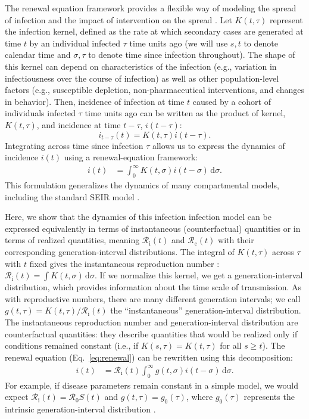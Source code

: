\documentclass[12pt]{article}
\newcommand{\eref}[1]{Eq.~\ref{eq:#1}}
\newcommand{\Rx}[1]{\ensuremath{{\mathcal R}_{#1}}\xspace}
\newcommand{\Ro}{\Rx{0}}
\newcommand{\Rc}{\Rx{\mathrm{c}}}
\newcommand{\Ri}{\Rx{\mathrm{i}}}
\newcommand{\dd}[1]{\ensuremath{\, \mathrm{d}#1}}
\newcommand{\dsigma}{\dd{\sigma}}
\begin{document}
The renewal equation framework provides a flexible way of modeling the spread of infection and the impact of intervention on the spread \citep{fraser2007estimating}.
Let $K(t, \tau)$ represent the infection kernel, defined as the rate at which secondary cases are generated at time $t$ by an individual infected $\tau$ time units ago (we will use $s, t$ to denote calendar time and $\sigma, \tau$ to denote time since infection throughout).
The shape of this kernel can depend on characteristics of the infection (e.g., variation in infectiousness over the course of infection) as well as other population-level factors (e.g., susceptible depletion, non-pharmaceutical interventions, and changes in behavior).
Then, incidence of infection at time $t$ caused by a cohort of individuals infected $\tau$ time units ago can be written as the product of kernel, $K(t, \tau)$, and incidence at time $t-\tau$, $i(t-\tau)$:
\begin{equation}
i_{t-\tau}(t) = K(t, \tau) i(t-\tau).
\end{equation}
Integrating across time since infection $\tau$ allows us to express the dynamics of incidence $i(t)$ using a renewal-equation framework: 
\begin{align}
i(t) &= \int_0^\infty K(t, \sigma) i(t-\sigma) \dsigma.
\label{eq:renewal}
\end{align}
This formulation generalizes the dynamics of many compartmental models, including the standard SEIR model \citep{heesterbeek1996concept, diekmann2000mathematical, roberts2004modelling, aldis2005integral, roberts2007model, champredon2018equivalence}.

Here, we show that the dynamics of this infection infection model can be expressed equivalently in terms of instantaneous (counterfactual) quantities or in terms of realized quantities, meaning $\Ri(t)$ and $\Rc(t)$ with their corresponding generation-interval distributions.
The integral of $K(t, \tau)$ across $\tau$ with $t$ fixed gives the instantaneous reproduction number \citep{fraser2007estimating}: $\Ri(t) = \int K(t, \sigma) \dsigma$.
If we normalize this kernel, we get a generation-interval distribution, which provides information about the time scale of transmission.
As with reproductive numbers, there are many different generation intervals; we call $g(t, \tau) = K(t, \tau)/\Ri(t)$ the ``instantaneous'' generation-interval distribution.
The instantaneous reproduction number and generation-interval distribution are counterfactual quantities: they describe quantities that would be realized only if conditions remained constant (i.e., if $K(s, \tau) = K(t, \tau)$ for all $s \geq t$).
The renewal equation (\eref{renewal}) can be rewritten using this decomposition:
\begin{align}
i(t) &= \Ri(t) \int_0^\infty g(t, \sigma) i(t-\sigma) \dsigma.
\label{eq:renewal_instantaneous}
\end{align}
For example, if disease parameters remain constant in a simple model, we would expect $\Ri(t) = \Ro S(t)$ and $g(t, \tau) = g_0(\tau)$, where $g_0(\tau)$ represents the intrinsic generation-interval distribution \citep{champredon2015intrinsic}.
\end{document}
